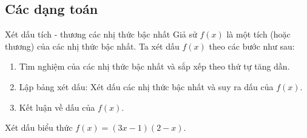 \subsection{Các dạng toán}

\begin{dang}{Xét dấu tích - thương các nhị thức bậc nhất}
	Giả sử $f(x)$ là một tích (hoặc thương) của các nhị thức bậc nhất. Ta xét dấu $f(x)$ theo các bước như sau:
	\begin{enumerate}[Bước 1:]
		\item Tìm nghiệm của các nhị thức bậc nhất và sắp xếp theo thứ tự tăng dần.
		\item Lập bảng xét dấu: Xét dấu các nhị thức bậc nhất và suy ra dấu của $f(x)$.
		\item Kết luận về dấu của $f(x)$.
	\end{enumerate}
\end{dang}

\begin{vd}%
	Xét dấu biểu thức $f(x)=(3x-1)(2-x)$.
\end{vd}

